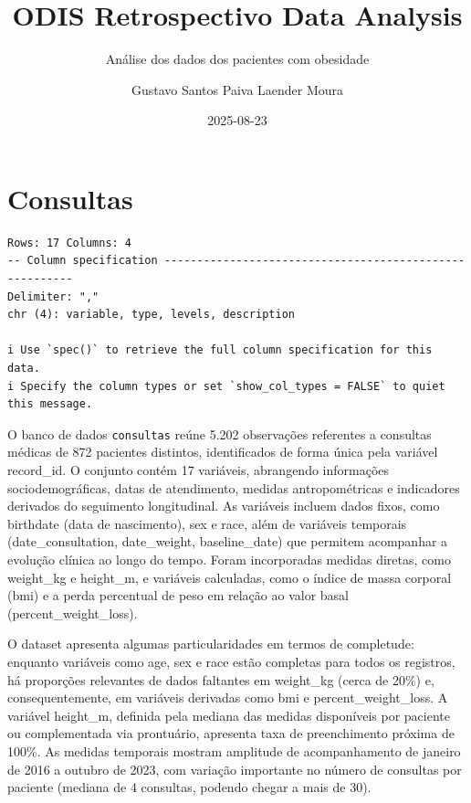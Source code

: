 \documentclass[
]{article}
\title{ODIS Retrospectivo Data Analysis}
\subtitle{Análise dos dados dos pacientes com obesidade}
\author{Gustavo Santos Paiva Laender Moura}
\date{2025-08-23}
\renewcommand*\contentsname{Table of contents}
\newcommand\contentsname{Table of contents}
\begin{document}
\maketitle

\renewcommand*\contentsname{Table of contents}
{
\hypersetup{linkcolor=}
\setcounter{tocdepth}{5}
\tableofcontents
}

\newpage{}

\section{Consultas}\label{consultas}

\begin{verbatim}
Rows: 17 Columns: 4
-- Column specification --------------------------------------------------------
Delimiter: ","
chr (4): variable, type, levels, description

i Use `spec()` to retrieve the full column specification for this data.
i Specify the column types or set `show_col_types = FALSE` to quiet this message.
\end{verbatim}

O banco de dados \texttt{consultas} reúne 5.202 observações referentes a
consultas médicas de 872 pacientes distintos, identificados de forma
única pela variável record\_id. O conjunto contém 17 variáveis,
abrangendo informações sociodemográficas, datas de atendimento, medidas
antropométricas e indicadores derivados do seguimento longitudinal. As
variáveis incluem dados fixos, como birthdate (data de nascimento), sex
e race, além de variáveis temporais (date\_consultation, date\_weight,
baseline\_date) que permitem acompanhar a evolução clínica ao longo do
tempo. Foram incorporadas medidas diretas, como weight\_kg e height\_m,
e variáveis calculadas, como o índice de massa corporal (bmi) e a perda
percentual de peso em relação ao valor basal (percent\_weight\_loss).

O dataset apresenta algumas particularidades em termos de completude:
enquanto variáveis como age, sex e race estão completas para todos os
registros, há proporções relevantes de dados faltantes em weight\_kg
(cerca de 20\%) e, consequentemente, em variáveis derivadas como bmi e
percent\_weight\_loss. A variável height\_m, definida pela mediana das
medidas disponíveis por paciente ou complementada via prontuário,
apresenta taxa de preenchimento próxima de 100\%. As medidas temporais
mostram amplitude de acompanhamento de janeiro de 2016 a outubro de
2023, com variação importante no número de consultas por paciente
(mediana de 4 consultas, podendo chegar a mais de 30).
\end{document}
